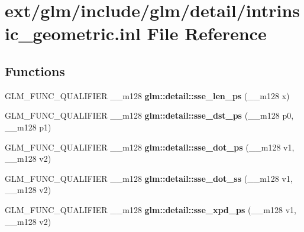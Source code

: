 \hypertarget{intrinsic__geometric_8inl}{\section{ext/glm/include/glm/detail/intrinsic\-\_\-geometric.inl File Reference}
\label{intrinsic__geometric_8inl}
}
\subsection*{Functions}
\begin{DoxyCompactItemize}
\item 
\hypertarget{namespaceglm_1_1detail_aa49baf7bcbe9eb783a85bcd3ce8d8dba}{G\-L\-M\-\_\-\-F\-U\-N\-C\-\_\-\-Q\-U\-A\-L\-I\-F\-I\-E\-R \-\_\-\-\_\-m128 {\bfseries glm\-::detail\-::sse\-\_\-len\-\_\-ps} (\-\_\-\-\_\-m128 x)}\label{namespaceglm_1_1detail_aa49baf7bcbe9eb783a85bcd3ce8d8dba}

\item 
\hypertarget{namespaceglm_1_1detail_a9d4832acb69aa3f67d6e06c64b29dddd}{G\-L\-M\-\_\-\-F\-U\-N\-C\-\_\-\-Q\-U\-A\-L\-I\-F\-I\-E\-R \-\_\-\-\_\-m128 {\bfseries glm\-::detail\-::sse\-\_\-dst\-\_\-ps} (\-\_\-\-\_\-m128 p0, \-\_\-\-\_\-m128 p1)}\label{namespaceglm_1_1detail_a9d4832acb69aa3f67d6e06c64b29dddd}

\item 
\hypertarget{namespaceglm_1_1detail_ad4dfd210b559dcff4cbc4a674477b90b}{G\-L\-M\-\_\-\-F\-U\-N\-C\-\_\-\-Q\-U\-A\-L\-I\-F\-I\-E\-R \-\_\-\-\_\-m128 {\bfseries glm\-::detail\-::sse\-\_\-dot\-\_\-ps} (\-\_\-\-\_\-m128 v1, \-\_\-\-\_\-m128 v2)}\label{namespaceglm_1_1detail_ad4dfd210b559dcff4cbc4a674477b90b}

\item 
\hypertarget{namespaceglm_1_1detail_a794070b64c8a2bd03e393c79be9ed17e}{G\-L\-M\-\_\-\-F\-U\-N\-C\-\_\-\-Q\-U\-A\-L\-I\-F\-I\-E\-R \-\_\-\-\_\-m128 {\bfseries glm\-::detail\-::sse\-\_\-dot\-\_\-ss} (\-\_\-\-\_\-m128 v1, \-\_\-\-\_\-m128 v2)}\label{namespaceglm_1_1detail_a794070b64c8a2bd03e393c79be9ed17e}

\item 
\hypertarget{namespaceglm_1_1detail_a0692599f2cf8b5a9fd64ccf7023805c7}{G\-L\-M\-\_\-\-F\-U\-N\-C\-\_\-\-Q\-U\-A\-L\-I\-F\-I\-E\-R \-\_\-\-\_\-m128 {\bfseries glm\-::detail\-::sse\-\_\-xpd\-\_\-ps} (\-\_\-\-\_\-m128 v1, \-\_\-\-\_\-m128 v2)}\label{namespaceglm_1_1detail_a0692599f2cf8b5a9fd64ccf7023805c7}


\end{DoxyCompactItemize}
